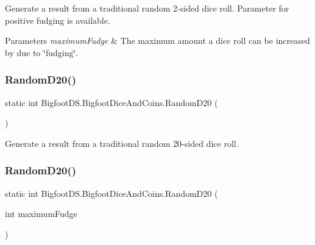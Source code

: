 Generate a result from a traditional random 2-\/sided dice roll. Parameter for positive fudging is available. 


\begin{DoxyParams}{Parameters}
{\em maximum\+Fudge} & The maximum amount a dice roll can be increased by due to \char`\"{}fudging\char`\"{}.\\
\hline
\end{DoxyParams}
\mbox{\label{class_bigfoot_d_s_1_1_bigfoot_dice_and_coins_aad9d7b91f049e912555cb199bc66d0d7}} 
\subsubsection{\texorpdfstring{Random\+D20()}{RandomD20()}\hspace{0.1cm}{\footnotesize\ttfamily [1/2]}}
{\footnotesize\ttfamily static int Bigfoot\+D\+S.\+Bigfoot\+Dice\+And\+Coins.\+Random\+D20 (\begin{DoxyParamCaption}{ }\end{DoxyParamCaption})\hspace{0.3cm}{\ttfamily [static]}}



Generate a result from a traditional random 20-\/sided dice roll. 

\mbox{\label{class_bigfoot_d_s_1_1_bigfoot_dice_and_coins_a7ad023ef095ad98f7d38c5b0234f2555}} 
\subsubsection{\texorpdfstring{Random\+D20()}{RandomD20()}\hspace{0.1cm}{\footnotesize\ttfamily [2/2]}}
{\footnotesize\ttfamily static int Bigfoot\+D\+S.\+Bigfoot\+Dice\+And\+Coins.\+Random\+D20 (\begin{DoxyParamCaption}\item[{int}]{maximum\+Fudge }\end{DoxyParamCaption})\hspace{0.3cm}{\ttfamily [static]}}



